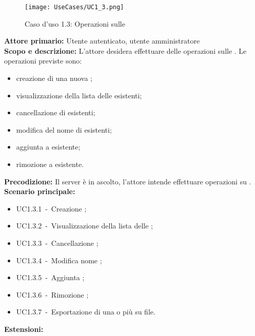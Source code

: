 \documentclass{scalatekids-article}
\begin{document}
\begin{figure}[H]
  \begin{center}
    \texttt{[image: UseCases/UC1\_3.png]}
    \caption{Caso d'uso 1.3: Operazioni sulle }
  \end{center}
\end{figure}
\textbf{Attore primario:} Utente autenticato, utente amministratore\\
\textbf{Scopo e descrizione:} L'attore desidera effettuare delle operazioni sulle . Le operazioni previste sono:
\begin{itemize}
\item creazione di una nuova ;
\item visualizzazione della lista delle  esistenti;
\item cancellazione di  esistenti;
\item modifica del nome di  esistenti;
\item aggiunta  a  esistente;
\item rimozione  a  esistente.
\end{itemize}
\textbf{Precodizione:} Il server è in ascolto, l'attore intende effettuare operazioni su .\\
\textbf{Scenario principale:}
\begin{itemize}
\item UC1.3.1\ -\ Creazione ;
\item UC1.3.2\ -\ Visualizzazione della lista delle ;
\item UC1.3.3\ -\ Cancellazione ;
\item UC1.3.4\ -\ Modifica nome ;
\item UC1.3.5\ -\ Aggiunta ;
\item UC1.3.6\ -\ Rimozione ;
\item UC1.3.7\ -\ Esportazione di una o più  su file.
\end{itemize}
\textbf{Estensioni:}
\end{document}
